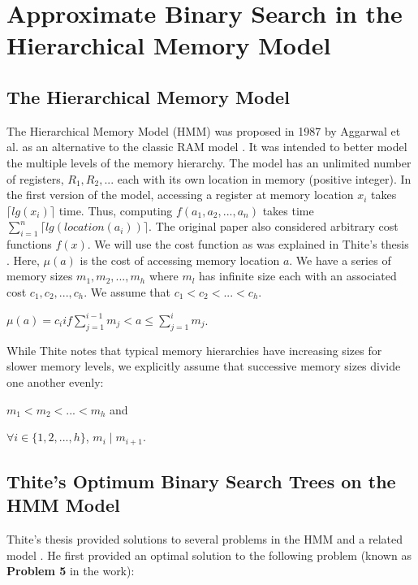 \documentclass[letterpaper,12pt,titlepage,oneside,final]{book}
\theoremstyle{plain}
\begin{document}
\chapter{Approximate Binary Search in the Hierarchical Memory Model} 
 
\section{The Hierarchical Memory Model}

The Hierarchical Memory Model (HMM) was proposed in 1987 by Aggarwal et al. as an alternative to the classic RAM model \cite{aggarwal1987model}. It was intended to better model the multiple levels of the memory hierarchy. The model has an unlimited number of registers, $R_1, R_2, ...$ each with its own location in memory (positive integer). In the first version of the model, accessing a register at memory location $x_i$ takes $\lceil lg(x_i) \rceil$ time. Thus, computing $f(a_1, a_2, ..., a_n)$ takes time $\sum_{i=1}^{n} \lceil lg(location(a_i)) \rceil$. The original paper also considered arbitrary cost functions $f(x)$. We will use the cost function as was explained in Thite's thesis \cite{thite2008optimum}. Here, $\mu (a)$ is the cost of accessing memory location $a$. We have a series of memory sizes $m_1, m_2, ..., m_h$ where $m_l$ has infinite size each with an associated cost $c_1, c_2, ..., c_h$. We assume that $c_1 < c_2 < ... < c_h$. 

\begin{center}$\mu (a) = c_i if \sum_{j = 1}^{i-1}m_j  < a \leq \sum_{j = 1}^{i}m_j$. \end{center}

While Thite notes that typical memory hierarchies have increasing sizes for slower memory levels, we explicitly assume that successive memory sizes divide one another evenly:
\begin{center}
$m_1 < m_2 < ... < m_h$ and
\end{center}
\begin{center}
$\forall i \in  \{1,2,...,h\}$, $m_i \mid m_{i+1}$.
\end{center}

\section{Thite's Optimum Binary Search Trees on the HMM Model}

Thite's thesis provided solutions to several problems in the HMM and a related model \cite{thite2008optimum}. He first provided an optimal solution to the following problem (known as \textbf{Problem 5} in the work):\\
\end{document}
